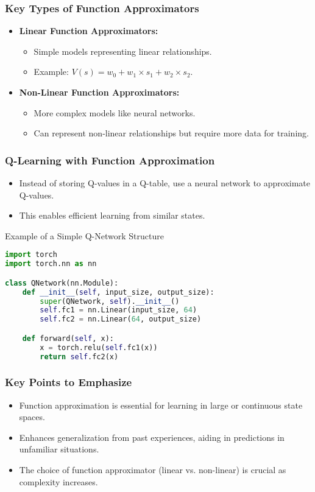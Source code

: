 \documentclass[aspectratio=169]{beamer}
\begin{document}
\begin{frame}[fragile]
    \frametitle{Key Types of Function Approximators}
    \begin{itemize}
        \item \textbf{Linear Function Approximators:} 
        \begin{itemize}
            \item Simple models representing linear relationships.
            \item Example: \( V(s) = w_0 + w_1 \times s_1 + w_2 \times s_2 \).
        \end{itemize}
        \item \textbf{Non-Linear Function Approximators:} 
        \begin{itemize}
            \item More complex models like neural networks.
            \item Can represent non-linear relationships but require more data for training.
        \end{itemize}
    \end{itemize}
\end{frame}

\begin{frame}[fragile]
    \frametitle{Q-Learning with Function Approximation}
    \begin{itemize}
        \item Instead of storing Q-values in a Q-table, use a neural network to approximate Q-values.
        \item This enables efficient learning from similar states.
    \end{itemize}
    \begin{block}{Example of a Simple Q-Network Structure}
        \begin{lstlisting}[language=Python]
import torch
import torch.nn as nn

class QNetwork(nn.Module):
    def __init__(self, input_size, output_size):
        super(QNetwork, self).__init__()
        self.fc1 = nn.Linear(input_size, 64)
        self.fc2 = nn.Linear(64, output_size)

    def forward(self, x):
        x = torch.relu(self.fc1(x))
        return self.fc2(x)
        \end{lstlisting}
    \end{block}
\end{frame}

\begin{frame}[fragile]
    \frametitle{Key Points to Emphasize}
    \begin{itemize}
        \item Function approximation is essential for learning in large or continuous state spaces.
        \item Enhances generalization from past experiences, aiding in predictions in unfamiliar situations.
        \item The choice of function approximator (linear vs. non-linear) is crucial as complexity increases.
    \end{itemize}
\end{frame}
\end{document}
